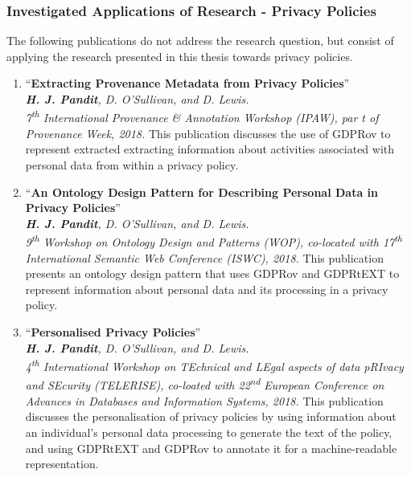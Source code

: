 \subsubsection{Investigated Applications of Research - Privacy Policies}
The following publications do not address the research question, but consist of applying the research presented in this thesis towards privacy policies.
\begin{enumerate}[resume]
    \item ``\textbf{Extracting Provenance Metadata from Privacy Policies}'' \cite{pandit_extracting_2018} \\
    \textit{\textbf{H. J. Pandit}, D. O’Sullivan, and D. Lewis.} \\ 
    \textit{7\textsuperscript{th} International Provenance \& Annotation Workshop (IPAW), par t of Provenance Week, 2018.}
    \vspace{0.1cm} \newline This publication discusses the use of GDPRov to represent extracted extracting information about activities associated with personal data from within a privacy policy.
    \item ``\textbf{An Ontology Design Pattern for Describing Personal Data in Privacy Policies}'' \cite{pandit_ontology_2018} \\
    \textit{\textbf{H. J. Pandit}, D. O’Sullivan, and D. Lewis.} \\ 
    \textit{9\textsuperscript{th} Workshop on Ontology Design and Patterns (WOP), co-located with 17\textsuperscript{th} International Semantic Web Conference (ISWC), 2018.}
    \vspace{0.1cm} \newline This publication presents an ontology design pattern that uses GDPRov and GDPRtEXT to represent information about personal data and its processing in a privacy policy.
    \item ``\textbf{Personalised Privacy Policies}'' \cite{pandit_personalised_2018} \\
    \textit{\textbf{H. J. Pandit}, D. O’Sullivan, and D. Lewis.} \\ 
    \textit{4\textsuperscript{th} International Workshop on TEchnical and LEgal aspects of data pRIvacy and SEcurity (TELERISE), co-loated with 22\textsuperscript{nd} European Conference on Advances in Databases and Information Systems, 2018.}
    \vspace{0.1cm} \newline This publication discusses the personalisation of privacy policies by using information about an individual's personal data processing to generate the text of the policy, and using GDPRtEXT and GDPRov to annotate it for a machine-readable representation.
\end{enumerate}

